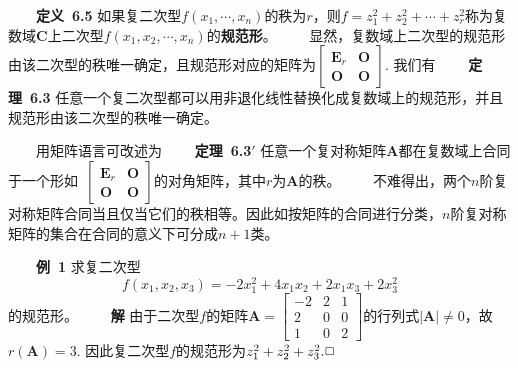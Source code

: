 \documentclass[compress,mathserif,cjk]{beamer}
\theoremstyle{remark}
\numberwithin{equation}{section}
\newcommand{\hei}{\bf}      %
\begin{document}
\begin{CJK}{UTF8}{gbsn}
\begin{frame}
\ \ \ \ {\hei 定义~6.5} 如果复二次型$f(x_1,\cdots,x_n)$的秩为$r$，则$f=z_1^2+z_2^2+\cdots+z_r^2$称为复数域$\mathbf C$上二次型$f(x_1,x_2,\cdots,x_n)$的{\hei 规范形}。
\pause\vskip 10pt
\ \ \ \ 显然，复数域上二次型的规范形由该二次型的秩唯一确定，且规范形对应的矩阵为$\left[\begin{matrix}\bm E_r&\bm O\\\bm O&\bm O\end{matrix}\right]$. \pause 我们有
\vskip 5pt
\ \ \ \ {\hei 定理~6.3} 任意一个复二次型都可以用非退化线性替换化成复数域上的规范形，并且规范形由该二次型的秩唯一确定。
\end{frame}

\begin{frame}
\ \ \ \ 用矩阵语言可改述为
\vskip 5pt
\ \ \ \ {\hei 定理~6.3$'$} 任意一个复对称矩阵$\bm A$都在复数域上合同于一个形如~$\left[\begin{matrix}\bm E_r&\bm O\\\bm O&\bm O\end{matrix}\right]$的对角矩阵，其中$r$为$\bm A$的秩。
\pause\vskip 10pt
\ \ \ \ 不难得出，两个$n$阶复对称矩阵合同当且仅当它们的秩相等。因此如按矩阵的合同进行分类，$n$阶复对称矩阵的集合在合同的意义下可分成$n+1$类。
\end{frame}

\begin{frame}
\ \ \ \ {\hei 例~1} 求复二次型
$$f(x_1,x_2,x_3)=-2x_1^2+4x_1x_2+2x_1x_3+2x_3^2$$
的规范形。
\pause\vskip 5pt
\ \ \ \ {\hei 解} 由于二次型$f$的矩阵$\bm A=\left[\begin{matrix}-2&2&1\\2&0&0\\1&0&2\end{matrix}\right]$的行列式$|\bm A|\neq0$，故$r(\bm A)=3$. 因此复二次型$f$的规范形为$z_1^2+z_2^2+z_3^2.\hfill\Box$
\end{frame}


\end{CJK}
\end{document}
